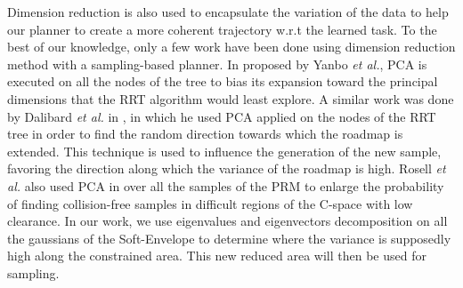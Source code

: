 \documentclass[letterpaper, 10 pt, conference]{ieeeconf}  %
\begin{document}
Dimension reduction is also used to encapsulate the variation of the data to help our planner to create a more coherent trajectory w.r.t the learned task. To the best of our knowledge, only a few work have been done using dimension reduction method with a sampling-based planner.  
In \cite{balancing_statespace_coveragePCA} proposed by Yanbo \textit{et al.}, PCA is executed on all the nodes of the tree to bias its expansion toward the principal dimensions that the RRT algorithm would least explore. A similar work was done by Dalibard \textit{et al.} in \cite{PCARRT2}, in which he used PCA applied on the nodes of the RRT tree in order to find the random direction towards which the roadmap is extended. This technique is used to influence the generation of the new sample, favoring the direction along which the variance of the roadmap is high. Rosell \textit{et al.} also used PCA in \cite{PCA_PRM} over all the samples of the PRM to enlarge the probability of finding collision-free samples
in difficult regions of the C-space with low clearance.
 In our work, we use eigenvalues and eigenvectors decomposition on all the gaussians of the Soft-Envelope to determine where the variance is supposedly high along the constrained area. This new reduced area will then be used for sampling.
\end{document}
